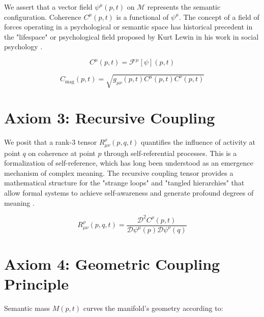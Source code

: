 We assert that a vector field \(\psi^\mu(p,t)\) on \(\mathcal{M}\) represents the semantic configuration. Coherence \(C^\mu(p,t)\) is a functional of \(\psi^\mu\). The concept of a field of forces operating in a psychological or semantic space has historical precedent in the "lifespace" or psychological field proposed by Kurt Lewin in his work in social psychology \autocite{Lewin1951}.

\begin{equation}
C^\mu(p,t) = \mathcal{F}^\mu[\psi](p,t)
\end{equation}

\begin{equation}
C_{\text{mag}}(p,t) = \sqrt{g_{\mu\nu}(p,t) C^\mu(p,t) C^\nu(p,t)}
\end{equation}


\section{Axiom 3: Recursive Coupling}
\label{1.3:axiom_3_recursive_coupling}

We posit that a rank-3 tensor \(R^\rho_{\mu\nu}(p,q,t)\) quantifies the influence of activity at point \(q\) on coherence at point \(p\) through self-referential processes. This is a formalization of self-reference, which has long been understood as an emergence mechanism of complex meaning. The recursive coupling tensor provides a mathematical structure for the "strange loops" and "tangled hierarchies" that allow formal systems to achieve self-awareness and generate profound degrees of meaning \autocite{Hofstadter1979}.

\begin{equation}
R^\rho_{\mu\nu}(p,q,t) = \frac{\mathcal{D}^2 C^\rho(p,t)}{\mathcal{D} \psi^\mu(p) \mathcal{D} \psi^\nu(q)}
\end{equation}


\section{Axiom 4: Geometric Coupling Principle}
\label{1.4:axiom_4_geometric_coupling_principle}

Semantic mass \(M(p,t)\) curves the manifold's geometry according to:

